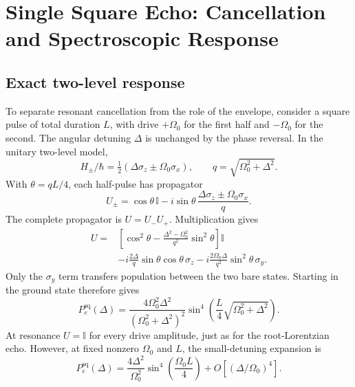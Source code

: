 \section{Single Square Echo: Cancellation and Spectroscopic Response}
\label{sec:square-echo-comparison}

\subsection{Exact two-level response}

To separate resonant cancellation from the role of the envelope, consider a
square pulse of total duration $L$, with drive $+\Omega_0$ for the first half
and $-\Omega_0$ for the second. The angular detuning $\Delta$ is unchanged by
the phase reversal. In the unitary two-level model,
\begin{equation}
    H_\pm/\hbar=\tfrac12(\Delta\sigma_z\pm\Omega_0\sigma_x),
    \qquad q=\sqrt{\Omega_0^2+\Delta^2}.
\end{equation}
With $\theta=qL/4$, each half-pulse has propagator
\begin{equation}
    U_\pm=\cos\theta\,\mathbb I
      -i\sin\theta\,\frac{\Delta\sigma_z\pm\Omega_0\sigma_x}{q}.
\end{equation}
The complete propagator is $U=U_-U_+$. Multiplication gives
\begin{equation}
    \begin{split}
    U={}&\left[\cos^2\theta-
      \frac{\Delta^2-\Omega_0^2}{q^2}\sin^2\theta\right]\mathbb I\\
      &-i\frac{2\Delta}{q}\sin\theta\cos\theta\,\sigma_z
       -i\frac{2\Omega_0\Delta}{q^2}\sin^2\theta\,\sigma_y.
    \end{split}
\end{equation}
Only the $\sigma_y$ term transfers population between the two bare states.
Starting in the ground state therefore gives
\begin{equation}
    P_e^{\mathrm{sq}}(\Delta)=
      \frac{4\Omega_0^2\Delta^2}{(\Omega_0^2+\Delta^2)^2}
      \sin^4\!\left(\frac{L}{4}\sqrt{\Omega_0^2+\Delta^2}\right).
    \label{eq:square-echo-exact}
\end{equation}
At resonance $U=\mathbb I$ for every drive amplitude, just as for the
root-Lorentzian echo. However, at fixed nonzero $\Omega_0$ and $L$, the
small-detuning expansion is
\begin{equation}
    P_e^{\mathrm{sq}}(\Delta)=
      \frac{4\Delta^2}{\Omega_0^2}
      \sin^4\!\left(\frac{\Omega_0 L}{4}\right)
      +O\!\left[(\Delta/\Omega_0)^4\right].
    \label{eq:square-echo-small-detuning}
\end{equation}
